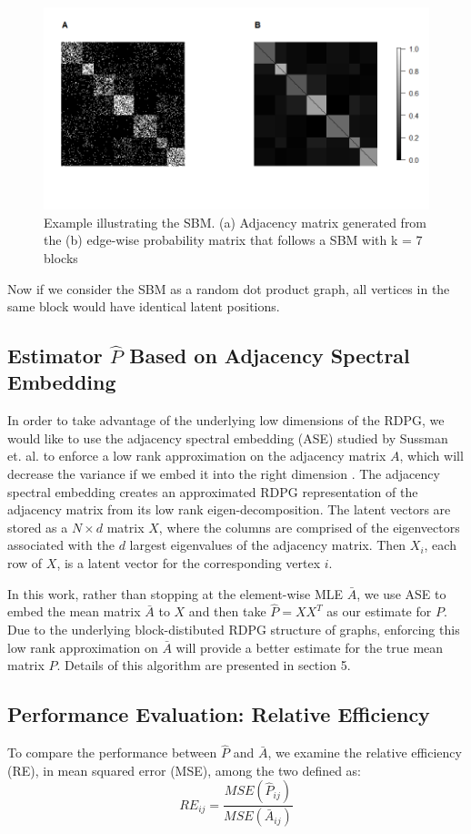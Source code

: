 \begin{figure}[!htb]
	\centering
	\includegraphics[width=16cm]{SBM_Example.png}
	\caption{Example illustrating the SBM. (a) Adjacency matrix generated from the (b) edge-wise probability matrix that follows a SBM with k = 7 blocks }
	\label{fig:plot1}
\end{figure}


Now if we consider the SBM as a random dot product graph, all vertices in the same block would have identical latent positions.



\subsection{Estimator $\hat{P}$ Based on Adjacency Spectral Embedding}
In order to take advantage of the underlying low dimensions of the RDPG,  we would like to use the adjacency spectral embedding (ASE) studied by Sussman et. al. to enforce a low rank approximation on the adjacency matrix $A$, which will decrease the variance if we embed it into the right dimension \cite{Sussman2012}.  The adjacency spectral embedding creates an approximated RDPG representation of the adjacency matrix from its low rank eigen-decomposition.  The latent vectors are stored as a $N \times d$ matrix $X$, where the columns are comprised of the eigenvectors associated with the $d$ largest eigenvalues of the adjacency matrix. Then $X_i$, each row of $X$, is a latent vector for the corresponding vertex $i$.

In this work, rather than stopping at the element-wise MLE $\bar{A}$, we use ASE to embed the mean matrix $\bar{A}$ to $X$ and then take $\hat{P} = X X^T$ as our estimate for $P$.  Due to the underlying block-distibuted RDPG structure of graphs, enforcing this low rank approximation on $\bar{A}$ will provide a better estimate for the true mean matrix $P$.  Details of this algorithm are presented in section 5.

\subsection{Performance Evaluation: Relative Efficiency}
To compare the performance between $\hat{P}$ and $\bar{A}$, we examine the relative efficiency (RE), in mean squared error (MSE), among the two defined as:
\begin{equation}
RE_{ij} = \frac{MSE(\hat{P}_{ij})}{MSE(\bar{A}_{ij})}
\end{equation}
